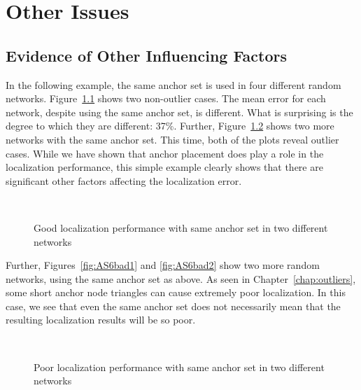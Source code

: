 \chapter{Other Issues}

\section{Evidence of Other Influencing Factors}
\label{sec:otherfactors}

In the following example, the same anchor set is used in four different random networks.  Figure~\ref{fig:AS6good} shows two non-outlier cases.  The mean error for each network, despite using the same anchor set, is different.  What is surprising is the degree to which they are different: 37\%.  Further, Figure~\ref{fig:AS6bad} shows two more networks with the same anchor set.  This time, both of the plots reveal outlier cases.  While we have shown that anchor placement does play a role in the localization performance, this simple example clearly shows that there are significant other factors affecting the localization error.

\begin{figure}
  \centering
	\\
	\caption{Good localization performance with same anchor set in two different networks}
	\label{fig:AS6good}
\end{figure}

Further, Figures~\ref{fig:AS6bad1} and \ref{fig:AS6bad2} show two more random networks, using the same anchor set as above.  As seen in Chapter~\ref{chap:outliers}, some short anchor node triangles can cause extremely poor localization.  In this case, we see that even the same anchor set does not necessarily mean that the resulting localization results will be so poor.  

\begin{figure}
  \centering
\\
    \caption{Poor localization performance with same anchor set in two different networks}
	\label{fig:AS6bad}
\end{figure}

